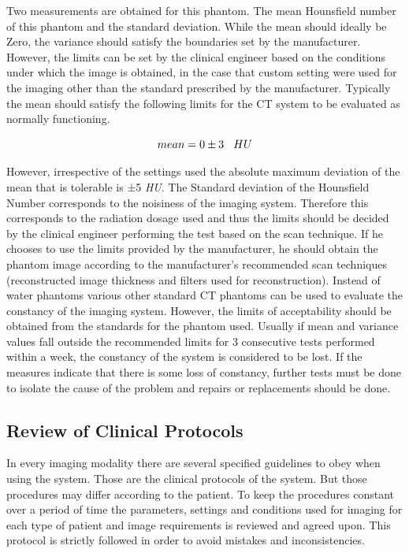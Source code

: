 \documentclass[12pt]{article}
\begin{document}
Two measurements are obtained for this phantom. The mean Hounsfield number of this phantom and the standard deviation. While the mean should ideally be Zero, the variance should satisfy the boundaries set by the manufacturer. However, the limits can be set by the clinical engineer based on the conditions under which the image is obtained, in the case that custom setting were used for the imaging other than the standard prescribed by the manufacturer. Typically the mean should satisfy the following limits for the CT system to be evaluated as normally functioning.

\begin{equation*}
    mean = 0 \pm 3  \hspace{0.3 cm} HU
\end{equation*}

However, irrespective of the settings used the absolute maximum deviation of the mean that is tolerable is ±5 \textit{HU}. The Standard deviation of the Hounsfield Number corresponds to the noisiness of the imaging system. Therefore this corresponds to the radiation dosage used and thus the limits should be decided by the clinical engineer performing the test based on the scan technique. If he chooses to use the limits provided by the manufacturer, he should obtain the phantom image according to the manufacturer’s recommended scan techniques (reconstructed image thickness and filters used for reconstruction). Instead of water phantoms various other standard CT phantoms can be used to evaluate the constancy of the imaging system. However, the limits of acceptability should be obtained from the standards for the phantom used. Usually if mean and variance values fall outside the recommended limits for 3 consecutive tests performed within a week, the constancy of the system is considered to be lost. If the measures indicate that there is some loss of constancy, further tests must be done to isolate the cause of the problem and repairs or replacements should be done.

\subsection{Review of Clinical Protocols}

In every imaging modality there are several specified guidelines to obey when using the system. Those are the clinical protocols of the system. But those procedures may differ according to the patient. To keep the procedures constant over a period of time the parameters, settings and conditions used for imaging for each type of patient and image requirements is reviewed and agreed upon. This protocol is strictly followed in order to avoid mistakes and inconsistencies.
\end{document}

